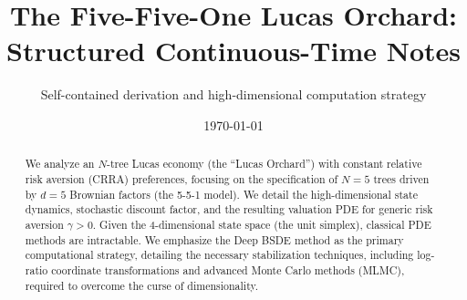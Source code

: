 \documentclass[11pt,letterpaper,oneside]{article}
\title{\vspace{-1.5em}The Five-Five-One Lucas Orchard: Structured Continuous-Time Notes}
\author{\small Self-contained derivation and high-dimensional computation strategy}
\date{\small \today}
\numberwithin{equation}{section}
\newcommand{\1}{\mathbf{1}}
\begin{document}
\maketitle
{}

\begin{abstract}


\noindent
We analyze an $N$-tree Lucas economy (the ``Lucas Orchard'') with constant relative risk aversion (CRRA) preferences, focusing on the specification of $N=5$ trees driven by $d=5$ Brownian factors (the 5-5-1 model). We detail the high-dimensional state dynamics, stochastic discount factor, and the resulting valuation PDE for generic risk aversion $\gamma>0$. Given the 4-dimensional state space (the unit simplex), classical PDE methods are intractable. We emphasize the Deep BSDE method as the primary computational strategy, detailing the necessary stabilization techniques, including log-ratio coordinate transformations and advanced Monte Carlo methods (MLMC), required to overcome the curse of dimensionality.
\end{abstract}

\tableofcontents
\newpage
\newpage
\end{document}
